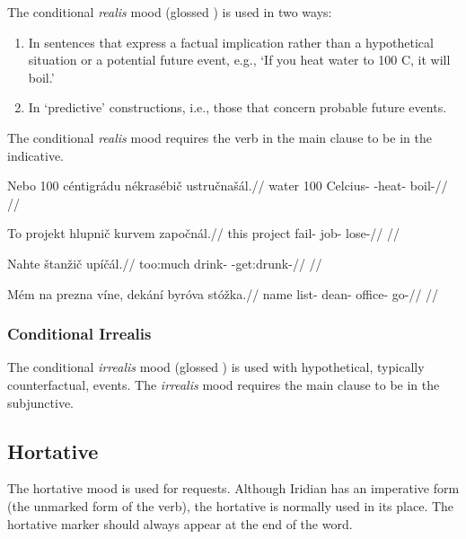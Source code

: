 \par The conditional \textit{realis} mood (glossed ) is used in two ways:
\begin{enumerate}
	\item In sentences that express a factual implication rather than a hypothetical situation or a potential future event, e.g., `If you heat water to 100 C, it will boil.'
	\item In `predictive' constructions, i.e., those that concern probable future events.
\end{enumerate}

The conditional \emph{realis} mood requires the verb in the main clause to be in the indicative.


\pex
\begingl
\gla Nebo 100 c\'entigr\'adu n\'ekras\'ebi\v{c} ustru\v{c}na\v{s}\'al.//
\glb water 100 Celcius- -heat- boil-//
\glft {}//
\endgl
\xe

\pex
\begingl
\gla To projekt hlupni\v{c} kurvem zapo\v{c}n\'al.//
\glb this project fail- job- lose-//
\glft {}//
\endgl
\xe

\pex
\begingl
\gla Nahte \v{s}tan\v{z}i\v{c} up\'i\v{c}\'al.//
\glb too:much drink- -get:drunk-//
\glft {}//
\endgl
\xe

\pex
\begingl
\gla M\'em na prezna v\'ine, dek\'an\'i byr\'ova st\'o\v{z}ka.//
\glb name  list-  dean- office- go-//
\glft {}//
\endgl
\xe

\subsubsection{Conditional Irrealis}
The conditional \textit{irrealis} mood (glossed ) is used with hypothetical, typically counterfactual, events. The \emph{irrealis} mood requires the main clause to be in the subjunctive.


\subsection{Hortative}
\par The hortative mood is used for requests. Although Iridian has an imperative form (the unmarked form of the verb), the hortative is normally used in its place. The hortative marker should always appear at the end of the word.

